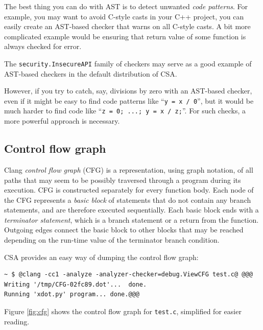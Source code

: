 \documentclass[a4paper,12pt]{article}
\newenvironment{nobr}{\begin{minipage}{\textwidth}\setlength\parskip{1em}
}{\end{minipage}\ignorespacesafterend}
\begin{document}
The best thing you can do with AST is to detect unwanted \emph{code patterns}. For example, you may want to avoid C-style casts in your C++ project, you can easily create an AST-based checker that warns on all C-style casts. A bit more complicated example would be ensuring that return value of some function is always checked for error.

The \lstinline|security.InsecureAPI| family of checkers may serve as a good example of AST-based checkers in the default distribution of CSA.

However, if you try to catch, say, divisions by zero with an AST-based checker, even if it might be easy to find code patterns like ``\lstinline|y = x / 0|'', but it would be much harder to find code like ``\lstinline|z = 0; ...; y = x / z;|''. For such checks, a more powerful approach is necessary.

\subsection{Control flow graph}

Clang \emph{control flow graph} (CFG) is a representation, using graph notation, of all paths that may seem to be possibly traversed through a program during its execution. CFG is constructed separately for every function body. Each node of the CFG represents a \emph{basic block} of statements that do not contain any branch statements, and are therefore executed sequentially. Each basic block ends with a \emph{terminator statement}, which is a branch statement or a return from the function. Outgoing edges connect the basic block to other blocks that may be reached depending on the run-time value of the terminator branch condition.

\begin{nobr}
CSA provides an easy way of dumping the control flow graph:

\begin{lstlisting}[style=commandline]
~ $ @clang -cc1 -analyze -analyzer-checker=debug.ViewCFG test.c@ @@@
Writing '/tmp/CFG-02fc89.dot'...  done.
Running 'xdot.py' program... done.@@@
\end{lstlisting}
\end{nobr}

Figure \ref{fig:cfg} shows the control flow graph for \lstinline|test.c|, simplified for easier reading.
\end{document}
